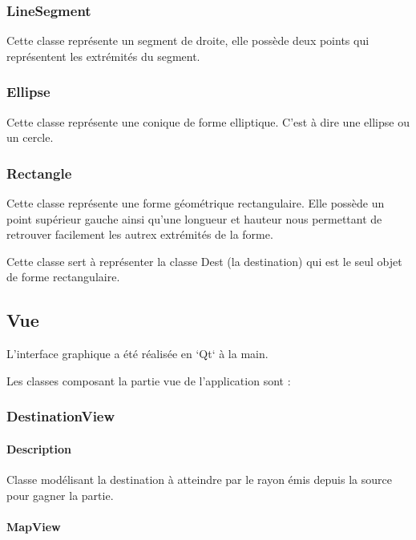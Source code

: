 \documentclass[]{article}
\begin{document}
\subsubsection{LineSegment}

Cette classe représente un segment de droite, elle possède
deux points qui représentent les extrémités du segment.

\subsubsection{Ellipse}


Cette classe représente une conique de forme elliptique.
C'est à dire une ellipse ou un cercle.

\subsubsection{Rectangle}

Cette classe représente une forme géométrique rectangulaire.
Elle possède un point supérieur gauche ainsi qu'une longueur et hauteur 
nous permettant de retrouver facilement les autrex extrémités de la 
forme.

Cette classe sert à représenter la classe Dest (la destination) qui est
le seul objet de forme rectangulaire.
	
\subsection{Vue}


L’interface graphique a été réalisée en `Qt` à la main.

Les classes composant la partie vue de l’application sont :

\subsubsection{DestinationView}

\paragraph{Description}


Classe modélisant la destination à atteindre par le rayon émis depuis la source pour gagner la partie.

\paragraph{MapView}
\end{document}
